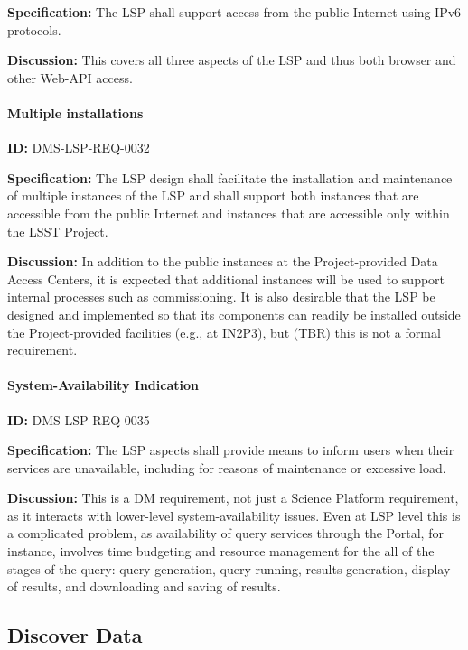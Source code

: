 \documentclass[SE,toc,lsstdraft]{lsstdoc}
\begin{document}
\textbf{Specification:}
The LSP shall support access from the public Internet using IPv6 protocols.

\textbf{Discussion:}
This covers all three aspects of the LSP and thus both browser and other Web-API access.

\paragraph{Multiple installations}\hfill  %

\label{DMS-LSP-REQ-0032}
\textbf{ID:} DMS-LSP-REQ-0032

\textbf{Specification:}
The LSP design shall facilitate the installation and maintenance of multiple instances of the LSP and shall support both instances that are accessible from the public Internet and instances that are accessible only within the LSST Project.

\textbf{Discussion:}
In addition to the public instances at the Project-provided Data Access Centers, it is expected that additional instances will be used to support internal processes such as commissioning.
It is also desirable that the LSP be designed and implemented so that its components can readily be installed outside the Project-provided facilities (e.g., at IN2P3), but (TBR) this is not a formal requirement.

\paragraph{System-Availability Indication}\hfill  %

\label{DMS-LSP-REQ-0035}
\textbf{ID:} DMS-LSP-REQ-0035

\textbf{Specification:}
The LSP aspects shall provide means to inform users when their services are unavailable, including for reasons of maintenance or excessive load.

\textbf{Discussion:}
This is a DM requirement, not just a Science Platform requirement, as it interacts with lower-level system-availability issues.
Even at LSP level this is a complicated problem, as availability of query services through the Portal, for instance, involves time budgeting and resource management for the all of the stages of the query: query generation, query running, results generation, display of results, and downloading and saving of results.

\subsection{Discover Data}
\end{document}
